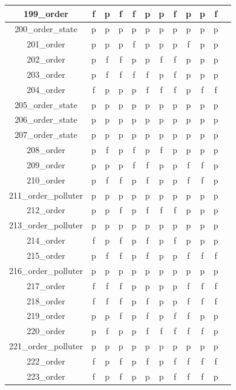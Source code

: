 \documentclass[
fancyheadings, %
%
%
]{stsreprt}
\begin{document}
\begin{longtable}{|c|c|c|c|c|c|c|c|c|c|c|c|}
\hline
199\_order & f & p & f & f & p & p & f & p & p & f \\
\hline
200\_order\_state & p & p & p & p & p & p & p & p & p & p \\
\hline
201\_order & p & p & p & f & p & p & p & f & p & p \\
\hline
202\_order & p & f & f & p & p & f & f & p & p & p \\
\hline
203\_order & p & f & f & f & f & p & f & p & p & p \\
\hline
204\_order & f & p & p & p & f & f & f & p & f & f \\
\hline
205\_order\_state & p & p & p & p & p & p & p & p & p & p \\
\hline
206\_order\_state & p & p & p & p & p & p & p & p & p & p \\
\hline
207\_order\_state & p & p & p & p & p & p & p & p & p & p \\
\hline
208\_order & p & f & p & f & p & f & p & p & p & p \\
\hline
209\_order & p & p & p & f & f & p & p & f & f & p \\
\hline
210\_order & p & f & f & p & f & p & p & f & f & p \\
\hline
211\_order\_polluter & p & p & p & p & p & p & p & p & p & p \\
\hline
212\_order & p & p & f & p & f & f & f & p & p & p \\
\hline
213\_order\_polluter & p & p & p & p & p & p & p & p & p & p \\
\hline
214\_order & f & p & f & p & f & p & f & p & p & p \\
\hline
215\_order & p & f & f & p & f & p & p & f & f & f \\
\hline
216\_order\_polluter & p & p & p & p & p & p & p & p & p & p \\
\hline
217\_order & f & f & f & p & p & p & p & f & f & f \\
\hline
218\_order & f & f & f & p & f & p & p & f & f & f \\
\hline
219\_order & p & p & f & p & f & p & f & f & p & p \\
\hline
220\_order & p & f & p & p & f & f & f & f & f & p \\
\hline
221\_order\_polluter & p & p & p & p & p & p & p & p & p & p \\
\hline
222\_order & f & p & f & p & f & p & f & f & f & f \\
\hline
223\_order & f & p & f & p & p & p & f & f & f & p \\
\hline

\end{longtable}
\end{document}
